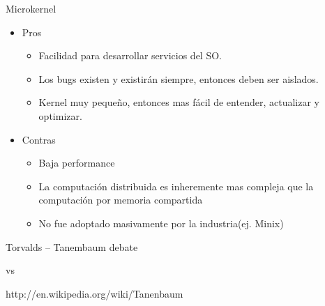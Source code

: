 \begin{frame}{Microkernel}

 \begin{itemize}
    \item Pros 
    \begin{itemize}
            \item \small Facilidad para desarrollar servicios del SO.
            \item \small Los bugs existen y existirán siempre, entonces deben ser aislados.
            \item  \small Kernel muy pequeño, entonces mas fácil de entender, actualizar y optimizar.  
       \end{itemize}
    \item Contras  
	\begin{itemize}
           \item  \small Baja performance
           \item  \small La computación distribuida es inheremente mas compleja que la computación por memoria compartida  
	   \item  \small No fue adoptado masivamente por la industria(ej. Minix)
	\end{itemize}
   \end{itemize} 
\end{frame}

\begin{frame}{Torvalds – Tanembaum debate}
  \begin{center}
      vs
   \end{center}
\begin{center}
 	http://en.wikipedia.org/wiki/Tanenbaum%
\end{center}
\end{frame}

